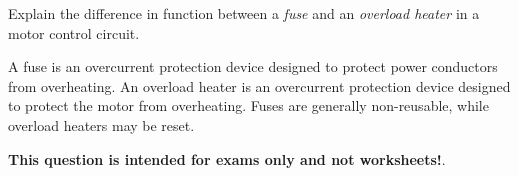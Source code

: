 

Explain the difference in function between a {\it fuse} and an {\it overload heater} in a motor control circuit.

\vskip 100pt







A fuse is an overcurrent protection device designed to protect power conductors from overheating.  An overload heater is an overcurrent protection device designed to protect the motor from overheating.  Fuses are generally non-reusable, while overload heaters may be reset.







{\bf This question is intended for exams only and not worksheets!}.


